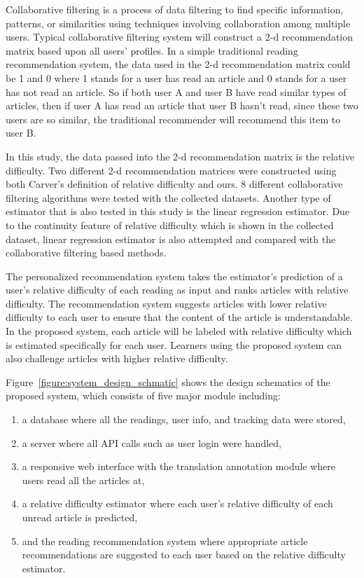 Collaborative filtering is a process of data filtering to find specific information, patterns, or similarities using techniques involving collaboration among multiple users. Typical collaborative filtering system will construct a 2-d recommendation matrix based upon all users' profiles. In a simple traditional reading recommendation system, the data used in the 2-d recommendation matrix could be 1 and 0 where 1 stands for a user has read an article and 0 stands for a user has not read an article. So if both user A and user B have read similar types of articles, then if user A has read an article that user B hasn't read, since these two users are so similar, the traditional recommender will recommend this item to user B.

In this study, the data passed into the 2-d recommendation matrix is the relative difficulty. Two different 2-d recommendation matrices were constructed using both Carver's definition of relative difficulty and ours. 8 different collaborative filtering algorithms were tested with the collected datasets. Another type of estimator that is also tested in this study is the linear regression estimator. Due to the continuity feature of relative difficulty which is shown in the collected dataset, linear regression estimator is also attempted and compared with the collaborative filtering based methods. 

The personalized recommendation system takes the estimator's prediction of a user's relative difficulty of each reading as input and ranks articles with relative difficulty. The recommendation system suggests articles with lower relative difficulty to each user to ensure that the content of the article is understandable. In the proposed system, each article will be labeled with relative difficulty which is estimated specifically for each user. Learners using the proposed system can also challenge articles with higher relative difficulty.

Figure~\ref{figure:system_design_schmatic} shows the design schematics of the proposed system, which consists of five major module including:
\begin{enumerate}
  \item a database where all the readings, user info, and tracking data were stored,
  \vspace{10pt}
  \item a server where all API calls such as user login were handled,
  \vspace{10pt}
  \item a responsive web interface with the translation annotation module where users read all the articles at,
  \vspace{10pt}
  \item a relative difficulty estimator where each user's relative difficulty of each unread article is predicted,
  \vspace{10pt}
  \item and the reading recommendation system where appropriate article recommendations are suggested to each user based on the relative difficulty estimator.
  \vspace{10pt}
\end{enumerate}

